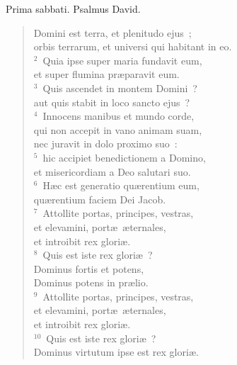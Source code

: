 \lettrine[lines=3,image=true,loversize=0.05,lraise=-0.03]{P}{}rima sabbati. Psalmus David. \begin{flushleft}\begin{verse}\vspace{6pt}Domini est terra, et plenitudo ejus~;\\ orbis terrarum, et universi qui habitant in eo.\\
${}^{2}$~Quia ipse super maria fundavit eum,\\ et super flumina pr\ae paravit eum.\\
${}^{3}$~Quis ascendet in montem Domini~?\\ aut quis stabit in loco sancto ejus~?\\
${}^{4}$~Innocens manibus et mundo corde,\\ qui non accepit in vano animam suam,\\ nec juravit in dolo proximo suo~:\\
${}^{5}$~hic accipiet benedictionem a Domino,\\ et misericordiam a Deo salutari suo.\\
${}^{6}$~H\ae c est generatio qu\ae rentium eum,\\ qu\ae rentium faciem Dei Jacob.\\
${}^{7}$~Attollite portas, principes, vestras,\\ et elevamini, port\ae\ \ae ternales,\\ et introibit rex glori\ae .\\
${}^{8}$~Quis est iste rex glori\ae~?\\ Dominus fortis et potens,\\ Dominus potens in pr\ae lio.\\
${}^{9}$~Attollite portas, principes, vestras,\\ et elevamini, port\ae\ \ae ternales,\\ et introibit rex glori\ae .\\
${}^{10}$~Quis est iste rex glori\ae~?\\ Dominus virtutum ipse est rex glori\ae .\end{verse}\end{flushleft}



